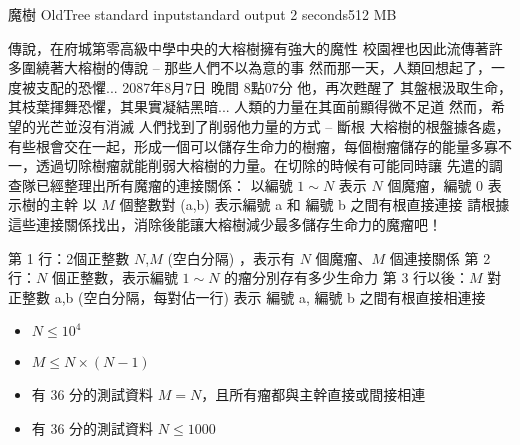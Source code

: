 \gdef\thisproblemauthor{}
\gdef\thisproblemdeveloper{}
\gdef\thisproblemorigin{}
\begin{problem}{魔樹 OldTree}
{standard input}{standard output}
{2 seconds}{512 MB}{}

傳說，在府城第零高級中學中央的大榕樹擁有強大的魔性\newline
校園裡也因此流傳著許多圍繞著大榕樹的傳說 -- 那些人們不以為意的事\newline
然而那一天，人類回想起了，一度被支配的恐懼...\newline
\newline
2087年8月7日 晚間 8點07分\newline
他，再次甦醒了\newline
其盤根汲取生命，其枝葉揮舞恐懼，其果實凝結黑暗...\newline
人類的力量在其面前顯得微不足道\newline
然而，希望的光芒並沒有消滅\newline
人們找到了削弱他力量的方式 -- 斷根\newline
\newline
大榕樹的根盤據各處，有些根會交在一起，形成一個可以儲存生命力的樹瘤，每個樹瘤儲存的能量多寡不一，透過切除樹瘤就能削弱大榕樹的力量。在切除的時候有可能同時讓
\newline
先遣的調查隊已經整理出所有魔瘤的連接關係：\newline
以編號 $1 \sim N$ 表示 $N$ 個魔瘤，編號 0 表示樹的主幹\newline
以 $M$ 個整數對 (a,b) 表示編號 a 和 編號 b 之間有根直接連接\newline
請根據這些連接關係找出，消除後能讓大榕樹減少最多儲存生命力的魔瘤吧！\newline


\InputFile

第 1 行：2個正整數 $N$,$M$ (空白分隔) ，表示有 $N$ 個魔瘤、$M$ 個連接關係 \newline
第 2 行：$N$ 個正整數，表示編號 $1 \sim N$ 的瘤分別存有多少生命力 \newline
第 3 行以後：$M$ 對正整數 a,b (空白分隔，每對佔一行) \newline
                      表示 編號 a, 編號 b 之間有根直接相連接  \newline

\begin{iofmt}
\begin{itemize}
	\item $N \leq 10^4$
	\item $M \leq N \times (N-1)$
	\item 有 36 分的測試資料 $M = N$，且所有瘤都與主幹直接或間接相連
	\item 有 36 分的測試資料 $N \leq 1000$
\end{itemize}
\end{iofmt}


\end{problem}
